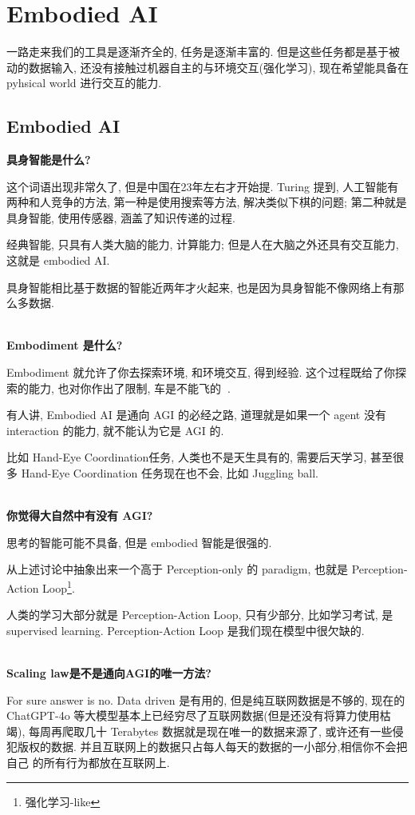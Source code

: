 \section{Embodied AI}

一路走来我们的工具是逐渐齐全的, 任务是逐渐丰富的. 但是这些任务都是基于被动的数据输入,
还没有接触过机器自主的与环境交互(强化学习), 现在希望能具备在 pyhsical world 进行交互的能力.

\subsection{Embodied AI}

\textbf{具身智能是什么?}

这个词语出现非常久了, 但是中国在23年左右才开始提.
Turing 提到, 人工智能有两种和人竞争的方法, 第一种是使用搜索等方法, 解决类似下棋的问题; 
第二种就是具身智能, 使用传感器, 涵盖了知识传递的过程.

经典智能, 只具有人类大脑的能力, 计算能力; 但是人在大脑之外还具有交互能力, 这就是 embodied AI.

具身智能相比基于数据的智能近两年才火起来, 也是因为具身智能不像网络上有那么多数据.

\textbf{\\Embodiment 是什么?}

Embodiment 就允许了你去探索环境, 和环境交互, 得到经验. 
这个过程既给了你探索的能力, 也对你作出了限制, 车是不能飞的🙂‍↔️.

有人讲, Embodied AI 是通向 AGI 的必经之路, 道理就是如果一个 agent 没有interaction 的能力,
就不能认为它是 AGI 的.

比如 Hand-Eye Coordination任务, 人类也不是天生具有的, 需要后天学习, 甚至很多
Hand-Eye Coordination 任务现在也不会, 比如 Juggling ball.

\textbf{\\你觉得大自然中有没有 AGI? }

思考的智能可能不具备, 但是 embodied 智能是很强的.

从上述讨论中抽象出来一个高于 Perception-only 的 paradigm, 
也就是 Perception-Action Loop\footnote{强化学习-like}.

人类的学习大部分就是 Perception-Action Loop, 只有少部分, 比如学习考试, 是 supervised learning.
Perception-Action Loop 是我们现在模型中很欠缺的.

\textbf{\\Scaling law是不是通向AGI的唯一方法?}

For sure answer is no. Data driven 是有用的, 但是纯互联网数据是不够的, 现在的
ChatGPT-4o 等大模型基本上已经穷尽了互联网数据(但是还没有将算力使用枯竭), 每周再爬取几十 Terabytes 数据就是现在唯一的数据来源了,
或许还有一些侵犯版权的数据. 并且互联网上的数据只占每人每天的数据的一小部分,相信你不会把自己
的所有行为都放在互联网上.

